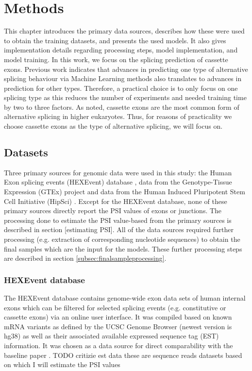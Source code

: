 \chapter{\label{ch:4-methods}Methods}


This chapter introduces the primary data sources, describes how these were used to obtain the training datasets, and presents the used models. It also gives implementation details regarding processing steps, model implementation, and model training.
In this work, we focus on the splicing prediction of cassette exons. Previous work indicates that advances in predicting one type of alternative splicing behaviour via Machine Learning methods also translates to advances in prediction for other types. Therefore, a practical choice is to only focus on one splicing type as this reduces the number of experiments and needed training time by two to three factors. As noted, cassette exons are the most common form of alternative splicing in higher eukaryotes. Thus, for reasons of practicality we choose cassette exons as the type of alternative splicing, we will focus on.
\section{Datasets}\label{sec:datasets}
Three primary sources for genomic data were used in this study: the Human Exon splicing events (HEXEvent) database \cite{hexevent}, data from the Genotype-Tissue Expression (GTEx) project \cite{gtex} and data from the Human Induced Pluripotent Stem Cell Initiative (HipSci) \cite{hipsci}. Except for the HEXEvent database, none of these primary sources directly report the PSI values of exons or junctions. The processing done to estimate the PSI value-based from the primary sources is described in section [estimating PSI]. All of the data sources required further processing (e.g. extraction of corresponding nucleotide sequences) to obtain the final samples which are the input for the models. These further processing steps are described in section \ref{subsec:finalsampleprocessing}.


\subsection{HEXEvent database} \label{subsec:hexevent}
The HEXEvent database contains genome-wide exon data sets of human internal exons which can be filtered for selected splicing events (e.g. constitutive or cassette exons) via an online user interface. It was compiled based on known mRNA variants as defined by the UCSC Genome Browser (newest version is hg38) as well as their associated available expressed sequence tag (EST) information.
It was chosen as a data source for direct comparability with the baseline paper \cite{dsc}.
TODO critizie est data
these are sequence reads datasets based on which I will estimate the PSI values

